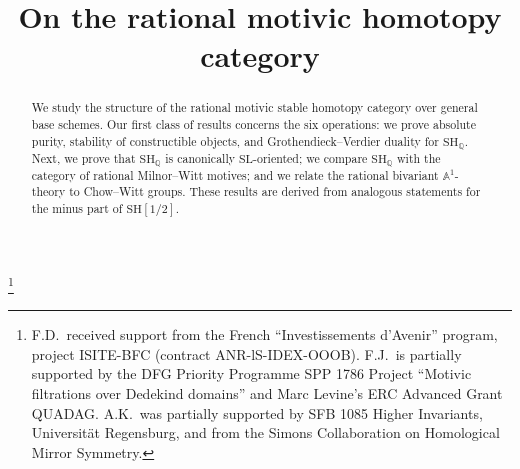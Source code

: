 \documentclass[JEP,XML,SOM,Unicode]{cedram}
\theoremstyle{remark}
\theoremstyle{definition}
\numberwithin{equation}{thm}
\begin{document}
\frontmatter
\title{On the rational motivic homotopy category}

\author[\initial{F.} \lastname{Déglise}]{ }
\address{ENS de Lyon, UMPA, UMR 5669\\
46 allée d'Italie, 69364 Lyon Cedex 07, France}

\author[\initial{J.} \lastname{Fasel}]{ }
\address{Institut Fourier - UMR 5582, Université Grenoble-Alpes\\
CS 40700, 38058 Grenoble Cedex 9, France}

\author[\initial{F.} \lastname{Jin}]{ }
\address{School of Mathematical Sciences, Tongji University\\
Siping Road 1239, 200092 Shanghai, China}

\author[\initial{A.} \middlename{A.} \lastname{Khan}]{\nobreakauthor {}\nobreakauthor {}}
\address{Institut des Hautes Études Scientifiques\\
35 route de Chartres, 91440 Bures-sur-Yvette, France\\
and\\
Institute of Mathematics, Academia Sinica\\
Taipei 10617, Taiwan}

\thanks{F.D.\ received support from the French ``Investissements d'Avenir'' program, project ISITE-BFC (contract ANR-lS-IDEX-OOOB). F.J.\ is partially supported by the DFG Priority Programme SPP 1786 Project ``Motivic filtrations over Dedekind domains'' and Marc Levine's ERC Advanced Grant QUADAG. A.K.\ was partially supported by SFB 1085 Higher Invariants, Universität Regensburg, and from the Simons Collaboration on Homological Mirror Symmetry.}

\begin{abstract}
We study the structure of the rational motivic stable homotopy category over general base schemes. Our first class of results concerns the six operations: we prove absolute purity, stability of constructible objects, and Grothendieck--Verdier duality for $\mathrm{SH}_\mathbb{Q}$. Next, we prove that $\mathrm{SH}_\mathbb{Q}$ is canonically $\mathrm{SL}$-oriented; we compare $\mathrm{SH}_\mathbb{Q}$ with the category of rational Milnor--Witt motives; and we relate the rational bivariant $\mathbb{A}^1$-theory to Chow--Witt groups. These results are derived from analogous statements for the minus part of $\mathrm{SH}[1/2]$.
\end{abstract}
\end{document}

